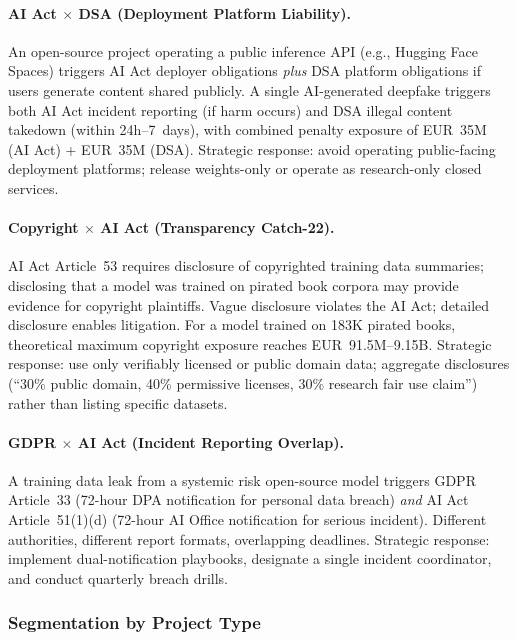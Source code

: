 \documentclass[11pt,a4paper]{article}
\begin{document}
\paragraph{AI Act $\times$ DSA (Deployment Platform Liability).} An open-source project operating a public inference API (e.g., Hugging Face Spaces) triggers AI Act deployer obligations \emph{plus} DSA platform obligations if users generate content shared publicly. A single AI-generated deepfake triggers both AI Act incident reporting (if harm occurs) and DSA illegal content takedown (within 24h--7~days), with combined penalty exposure of EUR~35M (AI Act) + EUR~35M (DSA). Strategic response: avoid operating public-facing deployment platforms; release weights-only or operate as research-only closed services.

\paragraph{Copyright $\times$ AI Act (Transparency Catch-22).} AI Act Article~53 requires disclosure of copyrighted training data summaries; disclosing that a model was trained on pirated book corpora may provide evidence for copyright plaintiffs. Vague disclosure violates the AI Act; detailed disclosure enables litigation. For a model trained on 183K pirated books, theoretical maximum copyright exposure reaches EUR~91.5M--9.15B. Strategic response: use only verifiably licensed or public domain data; aggregate disclosures (``30\% public domain, 40\% permissive licenses, 30\% research fair use claim'') rather than listing specific datasets.

\paragraph{GDPR $\times$ AI Act (Incident Reporting Overlap).} A training data leak from a systemic risk open-source model triggers GDPR Article~33 (72-hour DPA notification for personal data breach) \emph{and} AI Act Article~51(1)(d) (72-hour AI Office notification for serious incident). Different authorities, different report formats, overlapping deadlines. Strategic response: implement dual-notification playbooks, designate a single incident coordinator, and conduct quarterly breach drills.

\subsubsection{Segmentation by Project Type}
\end{document}
